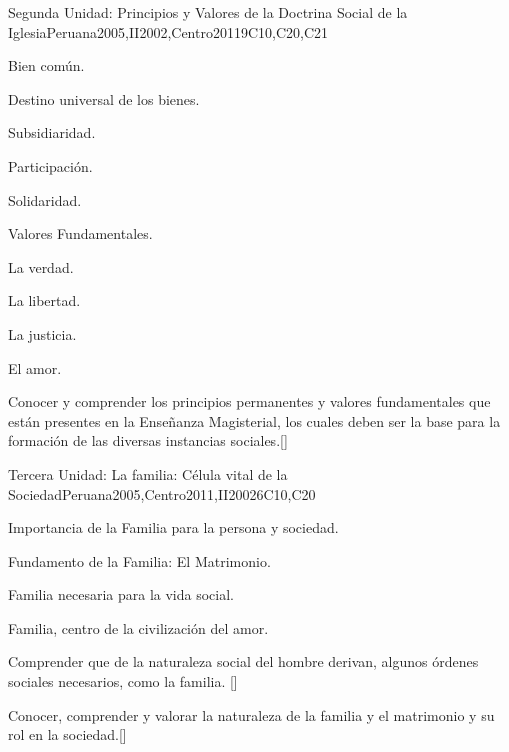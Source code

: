 \begin{syllabus}
\begin{unit}{}{Segunda Unidad: Principios y Valores de la Doctrina Social de la Iglesia}{Peruana2005,II2002,Centro2011}{9}{C10,C20,C21}
\begin{topics}
	\item Bien común.
	\item Destino universal de los bienes.
	\item Subsidiaridad.
	\item Participación.
	\item Solidaridad.
	\item Valores Fundamentales.
	    \begin{subtopics}
		\item La verdad.
		\item La libertad.
		\item La justicia.
		\item El amor.
	    \end{subtopics}
\end{topics}
\begin{learningoutcomes}
	\item Conocer y comprender los principios permanentes y valores fundamentales que están presentes en la Enseñanza Magisterial, los cuales deben ser la base para la formación de las diversas instancias sociales.[\Familiarity]
\end{learningoutcomes}
\end{unit}

\begin{unit}{}{Tercera Unidad: La familia: Célula vital de la Sociedad}{Peruana2005,Centro2011,II2002}{6}{C10,C20}
\begin{topics}
	\item Importancia de la Familia para la persona y sociedad.
	\item Fundamento de la Familia: El Matrimonio.
	\item Familia necesaria para la vida social.
	\item Familia, centro de la civilización del amor.
\end{topics}
\begin{learningoutcomes}
	\item Comprender que de la naturaleza social del hombre derivan, algunos órdenes sociales necesarios, como la familia. [\Familiarity]
	\item Conocer, comprender y valorar la naturaleza de la familia y el matrimonio y su rol en la sociedad.[\Familiarity]
\end{learningoutcomes}
\end{unit}


\end{syllabus}
